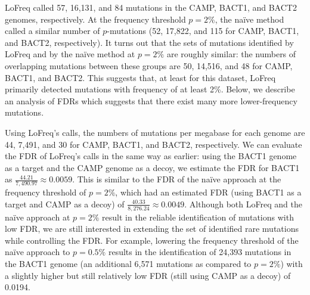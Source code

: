 LoFreq called 57, 16,131, and 84 mutations in the CAMP, BACT1, and BACT2 genomes, respectively. At the frequency threshold $p = 2\%$, the na\"ive method called a similar number of $p$-mutations (52, 17,822, and 115 for CAMP, BACT1, and BACT2, respectively). It turns out that the sets of mutations identified by LoFreq and by the na\"ive method at $p = 2\%$ are roughly similar: the numbers of overlapping mutations between these groups are 50, 14,516, and 48 for CAMP, BACT1, and BACT2. This suggests that, at least for this dataset, LoFreq primarily detected mutations with frequency of at least 2\%. Below, we describe an analysis of FDRs which suggests that there exist many more lower-frequency mutations.

Using LoFreq's calls, the numbers of mutations per megabase for each genome are 44, 7,491, and 30 for CAMP, BACT1, and BACT2, respectively. We can evaluate the FDR of LoFreq's calls in the same way as earlier: using the BACT1 genome as a target and the CAMP genome as a decoy, we estimate the FDR for BACT1 as $\frac{44.21}{7,490.97} \approx 0.0059$. This is similar to the FDR of the na\"ive approach at the frequency threshold of $p = 2\%$, which had an estimated FDR (using BACT1 as a target and CAMP as a decoy) of $\frac{40.33}{8,276.24} \approx 0.0049$. Although both LoFreq and the na\"ive approach at $p = 2\%$ result in the reliable identification of mutations with low FDR, we are still interested in extending the set of identified rare mutations while controlling the FDR. For example, lowering the frequency threshold of the na\"ive approach to $p = 0.5\%$ results in the identification of 24,393 mutations in the BACT1 genome (an additional 6,571 mutations as compared to $p = 2\%$) with a slightly higher but still relatively low FDR (still using CAMP as a decoy) of 0.0194.\endinput